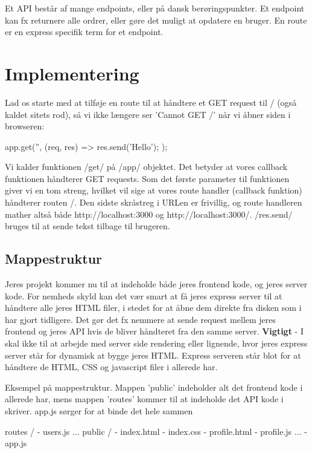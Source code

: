 \documentclass[english,course]{lecture}
\begin{document}
Et API består af mange endpoints, eller på dansk berøringspunkter. Et endpoint kan fx returnere alle ordrer, eller gøre det muligt at opdatere en bruger. En route er en express specifik term for et endpoint.

\section{Implementering}

Lad os starte med at tilføje en route til at håndtere et GET request til / (også kaldet sitets rod), så vi ikke længere ser 'Cannot GET /' når vi åbner siden i browseren:

\begin{jscode}
app.get('', (req, res) => {
	res.send('Hello');
});
\end{jscode}

Vi kalder funktionen \jsinline/get/ på \jsinline/app/ objektet. Det betyder at vores callback funktionen håndterer GET requests. Som det første parameter til funktionen giver vi en tom streng, hvilket vil sige at vores route handler (callback funktion) håndterer routen /. Den sidste skråstreg i URLen er frivillig, og route handleren mather altså både http://localhost:3000 og http://localhost:3000/. \jsinline/res.send/ bruges til at sende tekst tilbage til brugeren.

\subsection{Mappestruktur}

Jeres projekt kommer nu til at indeholde både jeres frontend kode, og jeres server kode. For nemheds skyld kan det vær smart at få jeres express server til at håndtere alle jeres HTML filer, i stedet for at åbne dem direkte fra disken som i har gjort tidligere. Det gør det fx nemmere at sende request mellem jeres frontend og jeres API hvis de bliver håndteret fra den samme server. \textbf{Vigtigt} - I skal ikke til at arbejde med server side rendering eller lignende, hvor jeres express server står for dynamisk at bygge jeres HTML. Express serveren står blot for at håndtere de HTML, CSS og javascript filer i allerede har.

\begin{listing}[H]
\caption{Eksempel på mappestruktur. Mappen 'public' indeholder alt det frontend kode i allerede har, mens mappen 'routes' kommer til at indeholde det API kode i skriver. app.js sørger for at binde det hele sammen}
\begin{bashcode}
routes /
	- users.js
	...
public /
	- index.html
	- index.css
	- profile.html
	- profile.js
	...
- app.js
\end{bashcode}
\end{listing}
\end{document}
